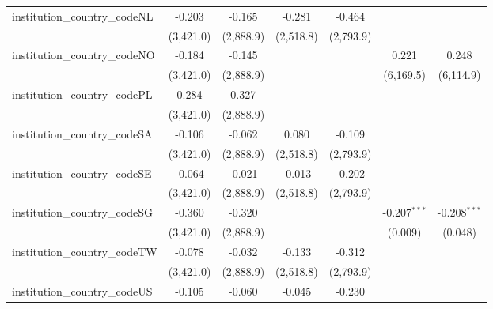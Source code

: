 \begin{tabular}{lcccccc}
   institution\_country\_codeNL          & -0.203         & -0.165         & -0.281        & -0.464        &                &   \\   
                                         & (3,421.0)      & (2,888.9)      & (2,518.8)     & (2,793.9)     &                &   \\   
   institution\_country\_codeNO          & -0.184         & -0.145         &               &               & 0.221          & 0.248\\   
                                         & (3,421.0)      & (2,888.9)      &               &               & (6,169.5)      & (6,114.9)\\   
   institution\_country\_codePL          & 0.284          & 0.327          &               &               &                &   \\   
                                         & (3,421.0)      & (2,888.9)      &               &               &                &   \\   
   institution\_country\_codeSA          & -0.106         & -0.062         & 0.080         & -0.109        &                &   \\   
                                         & (3,421.0)      & (2,888.9)      & (2,518.8)     & (2,793.9)     &                &   \\   
   institution\_country\_codeSE          & -0.064         & -0.021         & -0.013        & -0.202        &                &   \\   
                                         & (3,421.0)      & (2,888.9)      & (2,518.8)     & (2,793.9)     &                &   \\   
   institution\_country\_codeSG          & -0.360         & -0.320         &               &               & -0.207$^{***}$ & -0.208$^{***}$\\   
                                         & (3,421.0)      & (2,888.9)      &               &               & (0.009)        & (0.048)\\   
   institution\_country\_codeTW          & -0.078         & -0.032         & -0.133        & -0.312        &                &   \\   
                                         & (3,421.0)      & (2,888.9)      & (2,518.8)     & (2,793.9)     &                &   \\   
   institution\_country\_codeUS          & -0.105         & -0.060         & -0.045        & -0.230        &                &   \\   

\end{tabular}
